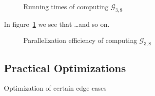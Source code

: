 \documentclass[
  paper=a4,
  DIV=14,
  fontsize=12pt,
  titlepage,
  bibliography=totoc,
  pagesize=pdftex
]{scrartcl}
\numberwithin{figure}{section}
\numberwithin{equation}{section}
\numberwithin{table}{section}
\theoremstyle{definition}
\numberwithin{definition}{section}
\begin{document}
\begin{figure}[htbp]
  \begin{center}
    
  \end{center}
  \caption{Running times of computing $\mathcal{G}_{3,8}$}
  \label{fig:g38scaling}
\end{figure}

In figure~\ref{fig:g38scaling} we see that \dots and so on.

\begin{figure}[htbp]
  \begin{center}
    
  \end{center}
  \caption{Parallelization efficiency of computing $\mathcal{G}_{3,8}$}
  \label{fig:g38efficiency}
\end{figure}

\subsection{Practical Optimizations}

Optimization of certain edge cases

\newpage
\listoffigures
\printbibliography
\end{document}
